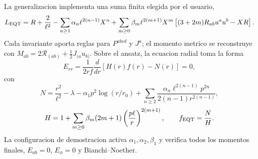 \documentclass[11pt,a4paper]{article}
\begin{document}
La generalizacion implementa una suma finita elegida por el usuario,
\[
L_{\rm EQT}=R+\frac{2}{\ell^2}
-\sum_{n\ge1}\alpha_n\ell^{2(n-1)}X^n
+\sum_{m\ge0}\beta_m\ell^{2(m+1)}X^m
\left[(3+2m)R_{ab}u^au^b-XR\right].
\]
Cada invariante aporta reglas para $P^{abcd}$ y $J^a$; el momento metrico se
reconstruye con $M_{ab}=2\mathcal R_{(ab)}+\tfrac12J_{(a}u_{b)}$. Sobre el
ansatz, la ecuacion radial toma la forma
\[
E_{rr}=\frac{1}{2rf}\frac{d}{dr}\left[H(r)f(r)-N(r)\right]=0,
\]
con
\[
N=\frac{r^2}{\ell^2}-\lambda-\alpha_1p^2\log(r/r_0)
+\sum_{n\ge2}\frac{\alpha_n\ell^{2(n-1)}p^{2n}}
{2(n-1)r^{2(n-1)}},
\]
\[
H=1+\sum_{m\ge0}\beta_m(2m+1)
\left(\frac{p\ell}{r}\right)^{2(m+1)},\qquad f_{\rm EQT}=\frac NH.
\]
La configuracion de demostracion activa $\alpha_1,\alpha_2,\beta_1$ y verifica
todos los momentos finales, $E_{ab}=0$, $E_\phi=0$ y Bianchi--Noether.
\end{document}
